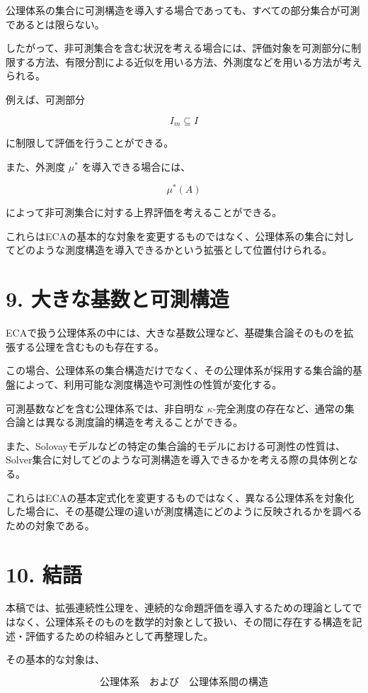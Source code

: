 \documentclass[12pt,a4paper]{article}
\begin{document}
公理体系の集合に可測構造を導入する場合であっても、すべての部分集合が可測であるとは限らない。

したがって、非可測集合を含む状況を考える場合には、評価対象を可測部分に制限する方法、有限分割による近似を用いる方法、外測度などを用いる方法が考えられる。

例えば、可測部分

\[
I_m\subseteq I
\]

に制限して評価を行うことができる。

また、外測度 $\mu^*$ を導入できる場合には、

\[
\mu^*(A)
\]

によって非可測集合に対する上界評価を考えることができる。

これらはECAの基本的な対象を変更するものではなく、公理体系の集合に対してどのような測度構造を導入できるかという拡張として位置付けられる。

\section{9. 大きな基数と可測構造}

ECAで扱う公理体系の中には、大きな基数公理など、基礎集合論そのものを拡張する公理を含むものも存在する。

この場合、公理体系の集合構造だけでなく、その公理体系が採用する集合論的基盤によって、利用可能な測度構造や可測性の性質が変化する。

可測基数などを含む公理体系では、非自明な $\kappa$-完全測度の存在など、通常の集合論とは異なる測度論的構造を考えることができる。

また、Solovayモデルなどの特定の集合論的モデルにおける可測性の性質は、Solver集合に対してどのような可測構造を導入できるかを考える際の具体例となる。

これらはECAの基本定式化を変更するものではなく、異なる公理体系を対象化した場合に、その基礎公理の違いが測度構造にどのように反映されるかを調べるための対象である。

\section{10. 結語}

本稿では、拡張連続性公理を、連続的な命題評価を導入するための理論としてではなく、公理体系そのものを数学的対象として扱い、その間に存在する構造を記述・評価するための枠組みとして再整理した。

その基本的な対象は、

\[
\boxed{
\text{公理体系}
\quad\text{および}\quad
\text{公理体系間の構造}
}
\]
\end{document}
